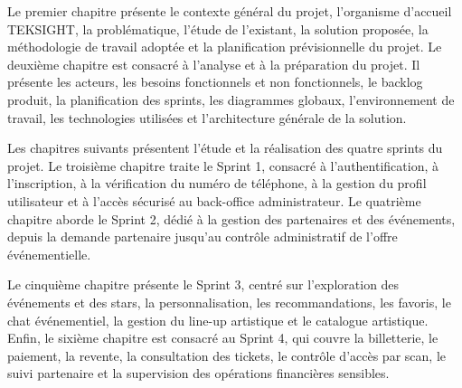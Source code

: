Le premier chapitre présente le contexte général du projet, l’organisme d’accueil TEKSIGHT, la problématique, l’étude de l’existant, la solution proposée, la méthodologie de travail adoptée et la planification prévisionnelle du projet. Le deuxième chapitre est consacré à l’analyse et à la préparation du projet. Il présente les acteurs, les besoins fonctionnels et non fonctionnels, le backlog produit, la planification des sprints, les diagrammes globaux, l’environnement de travail, les technologies utilisées et l’architecture générale de la solution.

Les chapitres suivants présentent l’étude et la réalisation des quatre sprints du projet. Le troisième chapitre traite le Sprint 1, consacré à l’authentification, à l’inscription, à la vérification du numéro de téléphone, à la gestion du profil utilisateur et à l’accès sécurisé au back-office administrateur. Le quatrième chapitre aborde le Sprint 2, dédié à la gestion des partenaires et des événements, depuis la demande partenaire jusqu’au contrôle administratif de l’offre événementielle.

Le cinquième chapitre présente le Sprint 3, centré sur l’exploration des événements et des stars, la personnalisation, les recommandations, les favoris, le chat événementiel, la gestion du line-up artistique et le catalogue artistique. Enfin, le sixième chapitre est consacré au Sprint 4, qui couvre la billetterie, le paiement, la revente, la consultation des tickets, le contrôle d’accès par scan, le suivi partenaire et la supervision des opérations financières sensibles.
